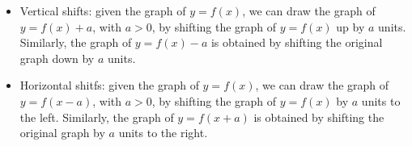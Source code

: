 \documentclass[handout, noauthor, nooutcomes]{ximera}
\begin{document}
%
%


\begin{summary}\begin{itemize}
\item Vertical shifts: given the graph of $y=f(x)$, we can draw the graph of $y=f(x)+a$, with $a>0$, by shifting the graph of $y=f(x)$ up by $a$ units. Similarly, the graph of $y=f(x)-a$ is obtained by shifting the original graph down by $a$ units.
\item Horizontal shitfs: given the graph of $y=f(x)$, we can draw the graph of $y=f(x-a)$, with $a>0$, by shifting the graph of $y=f(x)$ by $a$ units to the left. Similarly, the graph of $y=f(x+a)$ is obtained by shifting the original graph by $a$ units to the right.
\end{itemize}\end{summary}
\end{document}
